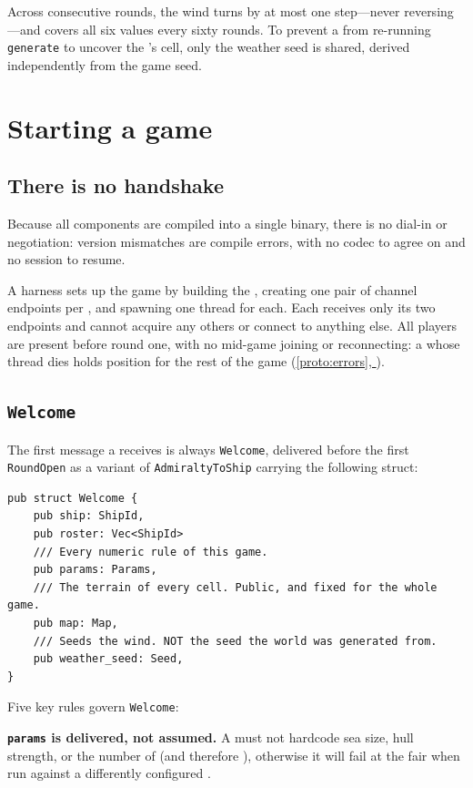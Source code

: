 \documentclass{article}
\newcommand{\fullref}[1]{\hyperref[#1]{\cref*{#1}, \nameref*{#1}}}
\begin{document}
Across consecutive rounds, the wind turns by at most
one step---never reversing---and covers all six values every sixty rounds. To prevent a \ship{}
from re-running \texttt{generate} to uncover the \treasure{}'s cell, only the weather seed is shared,
derived independently from the game seed.

\newpage
\section{Starting a game}
\label{proto:connect}

\subsection{There is no handshake}

Because all components are compiled into a single binary, there is no dial-in or negotiation:
version mismatches are compile errors, with no codec to agree on and no session to resume.

A harness sets up the game by building the \chart, creating one pair of channel endpoints per
\ship, and spawning one thread for each. Each \ship{} receives only its two endpoints and cannot
acquire any others or connect to anything else. All players are present before round one, with no
mid-game joining or reconnecting: a \ship{} whose thread dies holds position for the rest of the
game (\fullref{proto:errors}).

\subsection{\texttt{Welcome}}

The first message a \ship{} receives is always \texttt{Welcome}, delivered before the first
\texttt{RoundOpen} as a variant of \texttt{AdmiraltyToShip} carrying the following struct:

\begin{lstlisting}
pub struct Welcome {
    pub ship: ShipId,
    pub roster: Vec<ShipId>
    /// Every numeric rule of this game.
    pub params: Params,
    /// The terrain of every cell. Public, and fixed for the whole game.
    pub map: Map,
    /// Seeds the wind. NOT the seed the world was generated from.
    pub weather_seed: Seed,
}
\end{lstlisting}

Five key rules govern \texttt{Welcome}:

\textbf{\texttt{params} is delivered, not assumed.} A \ship{} must not hardcode sea size, hull
strength, or the number of \islands{} (and therefore \clues{}), otherwise it will fail at the fair
when run against a differently configured \chart{}.
\end{document}
